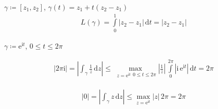 \begin{example}
  \begin{enum-arab}
    \item $\gamma \coloneq [z_1,z_2]$, $\gamma(t) = z_1 + t(z_2 - z_1)$
    \begin{align*}
      L(\gamma) = \int\limits_{0}^{1} |z_2 - z_1| \, \mathrm{d}t = |z_2 - z_1|
    \end{align*}
    
    \item $\gamma \coloneq \mathrm{e}^{\mathrm{i} t}$, $0 \leq t \leq 2 \pi$
    \begin{enum-alph}
      \item
      \begin{align*}
        |2 \pi \mathrm{i}| = \left| \int_\gamma \frac{1}{z} \, \mathrm{d}z \right| \leq \max\limits_{\substack{z = \mathrm{e}^{\mathrm{i} t}}{0 \leq t \leq 2 \pi}} \left| \frac{1}{z} \right| \, \int\limits_{0}^{2 \pi} \left| \mathrm{i} \,  \mathrm{e}^{\mathrm{i} t} \right| \, \mathrm{d}t = 2 \pi
      \end{align*}
      
      \item
      \begin{align*}
        |0| = \left| \int_\gamma z \, \mathrm{d}z \right| \leq \max\limits_{z = \mathrm{e}^{\mathrm{i} t}} |z| \, 2 \pi = 2 \pi
      \end{align*}
    \end{enum-alph}
  \end{enum-arab}
\end{example}

